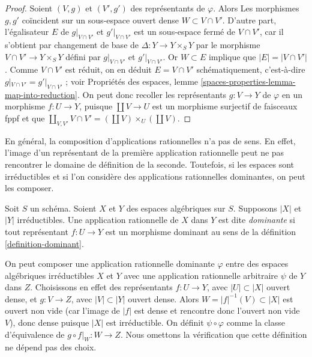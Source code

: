 \begin{proof}
Soient $(V, g)$ et $(V', g')$ des représentants de $\varphi$. Alors
Les morphismes $g, g'$ coïncident sur un sous-espace ouvert dense $W \subset V \cap V'$.
D'autre part, l'égalisateur $E$ de $g|_{V \cap V'}$ et $g'|_{V \cap V'}$
est un sous-espace fermé de $V \cap V'$, car il s'obtient par changement de base
de $\Delta : Y \to Y \times_S Y$ par le morphisme
$V \cap V' \to Y \times_S Y$ défini par $g|_{V \cap V'}$ et $g'|_{V \cap V'}$.
Or $W \subset E$ implique que $|E| = |V \cap V'|$. Comme $V \cap V'$
est réduit, on en déduit $E = V \cap V'$ schématiquement, c'est-à-dire
$g|_{V \cap V'} = g'|_{V \cap V'}$ ; voir
Propriétés des espaces, lemme \ref{spaces-properties-lemma-map-into-reduction}.
On peut donc recoller les représentants $g : V \to Y$ de $\varphi$
en un morphisme $f : U \to Y$, puisque $\coprod V \to U$ est un morphisme surjectif de
faisceaux fppf et que
$\coprod_{V, V'} V \cap V' = (\coprod V) \times_U (\coprod V)$.
\end{proof}

\noindent
En général, la composition d'applications rationnelles n'a pas de sens. En effet,
l'image d'un représentant de la première application rationnelle peut
ne pas rencontrer le domaine de définition de la seconde.
Toutefois, si les espaces sont irréductibles et si l'on considère
des applications rationnelles dominantes, on peut les composer.

\begin{definition}
\label{definition-dominant-rational}
Soit $S$ un schéma. Soient $X$ et $Y$ des espaces algébriques sur $S$.
Supposons $|X|$ et $|Y|$ irréductibles. Une application rationnelle de $X$ dans $Y$
est dite {\it dominante} si tout représentant $f : U \to Y$ est un morphisme dominant
au sens de la définition \ref{definition-dominant}.
\end{definition}

\noindent
On peut composer une application rationnelle dominante
$\varphi$ entre des espaces algébriques irréductibles
$X$ et $Y$ avec une application rationnelle arbitraire
$\psi$ de $Y$ dans $Z$. Choisissons en effet des
représentants $f : U \to Y$, avec $|U| \subset |X|$ ouvert dense,
et $g : V \to Z$, avec $|V| \subset |Y|$ ouvert dense. Alors
$W = |f|^{-1}(V) \subset |X|$ est ouvert non vide (car
l'image de $|f|$ est dense et rencontre donc l'ouvert non vide $V$),
donc dense puisque $|X|$ est irréductible. On définit $\psi \circ \varphi$
comme la classe d'équivalence de $g \circ f|_W : W \to Z$. Nous omettons la vérification
que cette définition ne dépend pas des choix.

